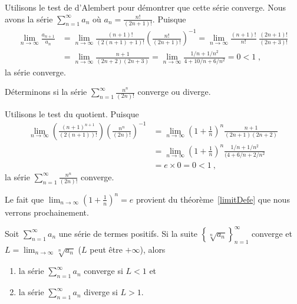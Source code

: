 {\begin{egg}
Utilisons le test de d'Alembert pour démontrer que cette
série converge.   Nous avons la série $\displaystyle \sum_{n=1}^\infty a_n$ où
$\displaystyle a_n = \frac{n!}{(2n+1)!}$.  Puisque
\begin{align*}
\lim_{n\rightarrow \infty} \frac{a_{n+1}}{a_n}
&= \lim_{n\rightarrow \infty} \frac{(n+1)!}{(2(n+1)+1)!}
\left(\frac{n!}{(2n+1)!}\right)^{-1}
= \lim_{n\rightarrow \infty}
\frac{(n+1)!}{n!}\;\frac{(2n+1)!}{(2n+3)!} \\
&= \lim_{n\rightarrow \infty} \frac{n+1}{(2n+2)(2n+3)}
= \lim_{n\rightarrow \infty} \frac{1/n + 1/n^2}{4 + 10/n + 6/n^2} = 0
<1 \; ,
\end{align*}
la série converge.
\end{egg}

\begin{egg}
Déterminons si la série
$\displaystyle \sum_{n=1}^\infty \frac{n^n}{(2n)!}$ converge ou diverge.

Utilisons le test du quotient.  Puisque
\begin{align*}
\lim_{n\to\infty} \left(\frac{(n+1)^{n+1}}{(2(n+1))!}\right)
\left(\frac{n^n}{(2n)!}\right)^{-1}
& = \lim_{n\to\infty} \left( 1 + \frac{1}{n}\right)^n
\frac{n+1}{(2n+1)(2n+2)}  \\
& = \lim_{n\to\infty} \left( 1 + \frac{1}{n}\right)^n
\frac{1/n + 1/n^2}{(4 + 6/n + 2/n^2}  \\
& = e \times 0 = 0 < 1 \ ,
\end{align*}
la série $\displaystyle \sum_{n=1}^\infty \frac{n^n}{(2n)!}$ converge.

Le fait que
$\displaystyle \lim_{n\to\infty} \left( 1 + \frac{1}{n}\right)^n = e$
provient du théorème~\ref{limitDefe} que nous verrons prochainement.
\end{egg}

\begin{focus}{\thm} \label{roottest}
Soit $\displaystyle \sum_{n=1}^\infty a_n$ une série de termes
positifs.  Si la suite
$\displaystyle \left\{ \sqrt[n]{a_n} \right\}_{n=1}^\infty$ converge
et $\displaystyle L = \lim_{n\rightarrow \infty} \sqrt[n]{a_n}$
($L$ peut être $+\infty$), alors
\begin{enumerate}
\item la série $\displaystyle \sum_{n=1}^\infty a_n$ converge si $L<1$ et
\item la série $\displaystyle \sum_{n=1}^\infty a_n$ diverge si $L>1$.
\end{enumerate}
\end{focus}

}
